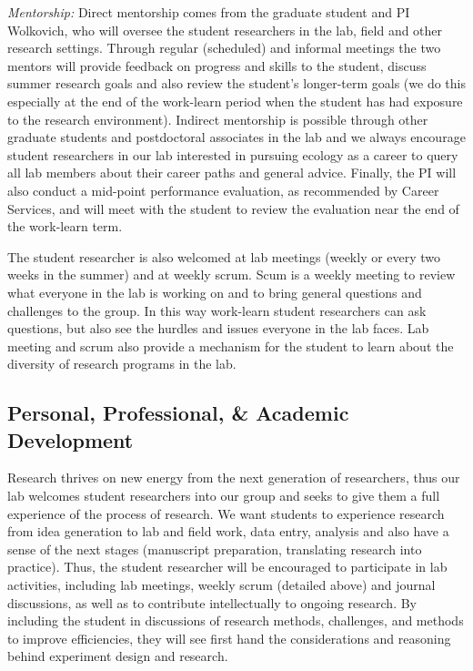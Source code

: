 \documentclass[11pt, oneside]{article}   	%
\begin{document}
\noindent \emph{Mentorship:}
Direct mentorship comes from the graduate student and PI Wolkovich, who will oversee the student researchers in the lab, field and other research settings. Through regular (scheduled) and informal meetings the two mentors will provide feedback on progress and skills to the student, discuss summer research goals and also review the student's longer-term goals (we do this especially at the end of the work-learn period when the student has had exposure to the research environment). Indirect mentorship is possible through other graduate students and postdoctoral associates in the lab and we always encourage student researchers in our lab interested in pursuing ecology as a career to query all lab members about their career paths and general advice. Finally, the PI will also conduct a mid-point performance evaluation, as recommended by Career Services, and will meet with the student to review the evaluation near the end of the work-learn term.

The student researcher is also welcomed at lab meetings (weekly or every two weeks in the summer) and at weekly scrum. Scum is a weekly meeting to review what everyone in the lab is working on and to bring general questions and challenges to the group. In this way work-learn student researchers can ask questions, but also see the hurdles and issues everyone in the lab faces. Lab meeting and scrum also provide a mechanism for the student to learn about the diversity of research programs in the lab. 


\subsection{Personal, Professional, \& Academic Development}
Research thrives on new energy from the next generation of researchers, thus our lab welcomes student researchers into our group and seeks to give them a full experience of the process of research. We want students to experience research from idea generation to lab and field work, data entry, analysis and also have a sense of the next stages (manuscript preparation, translating research into practice). Thus, the student researcher will be encouraged to participate in lab activities, including lab meetings, weekly scrum (detailed above) and journal discussions, as well as to contribute intellectually to ongoing research. By including the student in discussions of research methods, challenges, and methods to improve efficiencies, they will see first hand the considerations and reasoning behind experiment design and research. 
\end{document}

